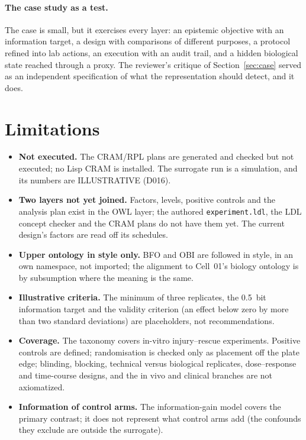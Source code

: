 \documentclass[10pt,a4paper]{article}
\begin{document}
\paragraph{The case study as a test.} The case is small, but it exercises every layer: an epistemic objective with
an information target, a design with comparisons of different purposes, a protocol refined into lab actions, an
execution with an audit trail, and a hidden biological state reached through a proxy. The reviewer's critique of
Section~\ref{sec:case} served as an independent specification of what the representation should detect, and it does.


\section{Limitations}\label{sec:limits}
\begin{itemize}
\item \textbf{Not executed.} The CRAM/RPL plans are generated and checked but not executed; no Lisp CRAM is installed.
  The surrogate run is a simulation, and its numbers are ILLUSTRATIVE (D016).
\item \textbf{Two layers not yet joined.} Factors, levels, positive controls and the analysis plan exist in the OWL
  layer; the authored \texttt{experiment.ldl}, the LDL concept checker and the CRAM plans do not have them yet. The
  current design's factors are read off its schedules.
\item \textbf{Upper ontology in style only.} BFO and OBI are followed in style, in an own namespace, not imported;
  the alignment to Cell~01's biology ontology is by subsumption where the meaning is the same.
\item \textbf{Illustrative criteria.} The minimum of three replicates, the 0.5~bit information target and the
  validity criterion (an effect below zero by more than two standard deviations) are placeholders, not recommendations.
\item \textbf{Coverage.} The taxonomy covers in-vitro injury--rescue experiments. Positive controls are defined;
  randomisation is checked only as placement off the plate edge; blinding, blocking, technical versus biological
  replicates, dose--response and time-course designs, and the in vivo and clinical branches are not axiomatized.
\item \textbf{Information of control arms.} The information-gain model covers the primary contrast; it does not
  represent what control arms add (the confounds they exclude are outside the surrogate).

\end{itemize}
\end{document}
